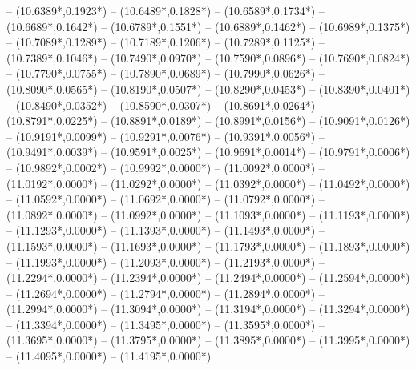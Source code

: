 {	-- ({10.6389*\dx},{0.1923*\dy})
	-- ({10.6489*\dx},{0.1828*\dy})
	-- ({10.6589*\dx},{0.1734*\dy})
	-- ({10.6689*\dx},{0.1642*\dy})
	-- ({10.6789*\dx},{0.1551*\dy})
	-- ({10.6889*\dx},{0.1462*\dy})
	-- ({10.6989*\dx},{0.1375*\dy})
	-- ({10.7089*\dx},{0.1289*\dy})
	-- ({10.7189*\dx},{0.1206*\dy})
	-- ({10.7289*\dx},{0.1125*\dy})
	-- ({10.7389*\dx},{0.1046*\dy})
	-- ({10.7490*\dx},{0.0970*\dy})
	-- ({10.7590*\dx},{0.0896*\dy})
	-- ({10.7690*\dx},{0.0824*\dy})
	-- ({10.7790*\dx},{0.0755*\dy})
	-- ({10.7890*\dx},{0.0689*\dy})
	-- ({10.7990*\dx},{0.0626*\dy})
	-- ({10.8090*\dx},{0.0565*\dy})
	-- ({10.8190*\dx},{0.0507*\dy})
	-- ({10.8290*\dx},{0.0453*\dy})
	-- ({10.8390*\dx},{0.0401*\dy})
	-- ({10.8490*\dx},{0.0352*\dy})
	-- ({10.8590*\dx},{0.0307*\dy})
	-- ({10.8691*\dx},{0.0264*\dy})
	-- ({10.8791*\dx},{0.0225*\dy})
	-- ({10.8891*\dx},{0.0189*\dy})
	-- ({10.8991*\dx},{0.0156*\dy})
	-- ({10.9091*\dx},{0.0126*\dy})
	-- ({10.9191*\dx},{0.0099*\dy})
	-- ({10.9291*\dx},{0.0076*\dy})
	-- ({10.9391*\dx},{0.0056*\dy})
	-- ({10.9491*\dx},{0.0039*\dy})
	-- ({10.9591*\dx},{0.0025*\dy})
	-- ({10.9691*\dx},{0.0014*\dy})
	-- ({10.9791*\dx},{0.0006*\dy})
	-- ({10.9892*\dx},{0.0002*\dy})
	-- ({10.9992*\dx},{0.0000*\dy})
	-- ({11.0092*\dx},{0.0000*\dy})
	-- ({11.0192*\dx},{0.0000*\dy})
	-- ({11.0292*\dx},{0.0000*\dy})
	-- ({11.0392*\dx},{0.0000*\dy})
	-- ({11.0492*\dx},{0.0000*\dy})
	-- ({11.0592*\dx},{0.0000*\dy})
	-- ({11.0692*\dx},{0.0000*\dy})
	-- ({11.0792*\dx},{0.0000*\dy})
	-- ({11.0892*\dx},{0.0000*\dy})
	-- ({11.0992*\dx},{0.0000*\dy})
	-- ({11.1093*\dx},{0.0000*\dy})
	-- ({11.1193*\dx},{0.0000*\dy})
	-- ({11.1293*\dx},{0.0000*\dy})
	-- ({11.1393*\dx},{0.0000*\dy})
	-- ({11.1493*\dx},{0.0000*\dy})
	-- ({11.1593*\dx},{0.0000*\dy})
	-- ({11.1693*\dx},{0.0000*\dy})
	-- ({11.1793*\dx},{0.0000*\dy})
	-- ({11.1893*\dx},{0.0000*\dy})
	-- ({11.1993*\dx},{0.0000*\dy})
	-- ({11.2093*\dx},{0.0000*\dy})
	-- ({11.2193*\dx},{0.0000*\dy})
	-- ({11.2294*\dx},{0.0000*\dy})
	-- ({11.2394*\dx},{0.0000*\dy})
	-- ({11.2494*\dx},{0.0000*\dy})
	-- ({11.2594*\dx},{0.0000*\dy})
	-- ({11.2694*\dx},{0.0000*\dy})
	-- ({11.2794*\dx},{0.0000*\dy})
	-- ({11.2894*\dx},{0.0000*\dy})
	-- ({11.2994*\dx},{0.0000*\dy})
	-- ({11.3094*\dx},{0.0000*\dy})
	-- ({11.3194*\dx},{0.0000*\dy})
	-- ({11.3294*\dx},{0.0000*\dy})
	-- ({11.3394*\dx},{0.0000*\dy})
	-- ({11.3495*\dx},{0.0000*\dy})
	-- ({11.3595*\dx},{0.0000*\dy})
	-- ({11.3695*\dx},{0.0000*\dy})
	-- ({11.3795*\dx},{0.0000*\dy})
	-- ({11.3895*\dx},{0.0000*\dy})
	-- ({11.3995*\dx},{0.0000*\dy})
	-- ({11.4095*\dx},{0.0000*\dy})
	-- ({11.4195*\dx},{0.0000*\dy})
}
